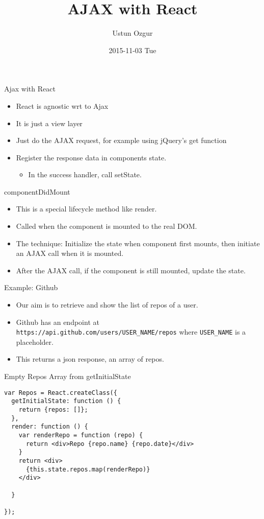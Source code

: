 \documentclass[presentation]{beamer}
\author{Ustun Ozgur}
\date{2015-11-03 Tue}
\title{AJAX with React}
\begin{document}
\maketitle

\begin{frame}[label={sec:orgheadline1}]{Ajax with React}
\begin{itemize}
\item React is agnostic wrt to Ajax
\item It is just a view layer
\item Just do the AJAX request, for example using jQuery's get function
\item Register the response data in components state.
\begin{itemize}
\item In the success handler, call setState.
\end{itemize}
\end{itemize}
\end{frame}

\begin{frame}[label={sec:orgheadline2}]{componentDidMount}
\begin{itemize}
\item This is a special lifecycle method like render.
\item Called when the component is mounted to the real DOM.
\item The technique: Initialize the state when component first mounts, then
initiate an AJAX call when it is mounted.
\item After the AJAX call, if the component is still mounted, update the state.
\end{itemize}
\end{frame}

\begin{frame}[fragile,label={sec:orgheadline3}]{Example: Github}
 \begin{itemize}
\item Our aim is to retrieve and show the list of repos of a user.
\item Github has an endpoint at \texttt{https://api.github.com/users/USER\_NAME/repos} where
\texttt{USER\_NAME} is a placeholder.
\item This returns a json response, an array of repos.
\end{itemize}
\end{frame}

\begin{frame}[fragile,label={sec:orgheadline4}]{Empty Repos Array from getInitialState}
 \begin{verbatim}
var Repos = React.createClass({
  getInitialState: function () {
    return {repos: []};
  },
  render: function () {
    var renderRepo = function (repo) {
      return <div>Repo {repo.name} {repo.date}</div>
    }
    return <div>
      {this.state.repos.map(renderRepo)}
    </div>

  }

});
\end{verbatim}
\end{frame}
\end{document}
